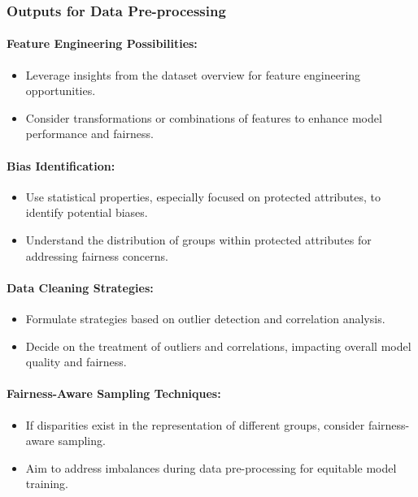 \subsubsection{Outputs for Data Pre-processing}

\paragraph{Feature Engineering Possibilities:}
\begin{itemize}
    \item Leverage insights from the dataset overview for feature engineering opportunities.
    \item Consider transformations or combinations of features to enhance model performance and fairness.
\end{itemize}

\paragraph{Bias Identification:}
\begin{itemize}
    \item Use statistical properties, especially focused on protected attributes, to identify potential biases.
    \item Understand the distribution of groups within protected attributes for addressing fairness concerns.
\end{itemize}

\paragraph{Data Cleaning Strategies:}
\begin{itemize}
    \item Formulate strategies based on outlier detection and correlation analysis.
    \item Decide on the treatment of outliers and correlations, impacting overall model quality and fairness.
\end{itemize}

\paragraph{Fairness-Aware Sampling Techniques:}
\begin{itemize}
    \item If disparities exist in the representation of different groups, consider fairness-aware sampling.
    \item Aim to address imbalances during data pre-processing for equitable model training.
\end{itemize}

